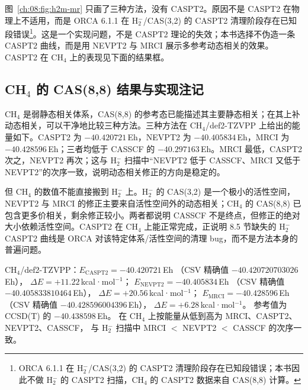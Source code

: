图~\ref{ch:08:fig:h2m-mr} 只画了三种方法，没有 CASPT2。原因不是 CASPT2 在物理上不适用，而是 ORCA 6.1.1 在 H$_2^-$/CAS(3,2) 的 CASPT2 清理阶段存在已知段错误\footnote{ORCA 6.1.1 在 H$_2^-$/CAS(3,2) 的 CASPT2 清理阶段存在已知段错误；本书因此不做 H$_2^-$ 的 CASPT2 扫描，CH$_4$ 的 CASPT2 数据来自 CAS(8,8) 计算。}。这是一个实现问题，不是 CASPT2 理论的失效；本书选择不伪造一条 CASPT2 曲线，而是用 NEVPT2 与 MRCI 展示多参考动态相关的效果。CASPT2 在 CH$_4$ 上的表现见下面的结果框。

\subsection{CH$_4$ 的 CAS(8,8) 结果与实现注记}
\label{ch:08:sec:ch4}

CH$_4$ 是弱静态相关体系，CAS(8,8) 的参考态已能描述其主要静态相关；在其上补动态相关，可以干净地比较三种方法。三种方法在 CH$_4$/def2-TZVPP 上给出的能量如下。CASPT2 为 $-40.420721$\,Eh，NEVPT2 为 $-40.405834$\,Eh，MRCI 为 $-40.428596$\,Eh；三者均低于 CASSCF 的 $-40.297163$\,Eh。MRCI 最低，CASPT2 次之，NEVPT2 再次；这与 H$_2^-$ 扫描中“NEVPT2 低于 CASSCF、MRCI 又低于 NEVPT2”的次序一致，说明动态相关修正的方向是稳定的。

但 CH$_4$ 的数值不能直接搬到 H$_2^-$ 上。H$_2^-$ 的 CAS(3,2) 是一个极小的活性空间，NEVPT2 与 MRCI 的修正主要来自活性空间外的动态相关；CH$_4$ 的 CAS(8,8) 已包含更多价相关，剩余修正较小。两者都说明 CASSCF 不是终点，但修正的绝对大小依赖活性空间。CASPT2 在 CH$_4$ 上能正常完成，正说明 8.5 节缺失的 H$_2^-$ CASPT2 曲线是 ORCA 对该特定体系/活性空间的清理 bug，而不是方法本身的普遍问题。

\begin{ch4box}
CH$_4$/def2-TZVPP：$E_{\mathrm{CASPT2}} = -40.420721$\,Eh
（CSV 精确值 $-40.420720703026$\,Eh），
$\Delta E = +11.22$\,kcal·mol$^{-1}$；
$E_{\mathrm{NEVPT2}} = -40.405834$\,Eh
（CSV 精确值 $-40.405833810464$\,Eh），
$\Delta E = +20.56$\,kcal·mol$^{-1}$；
$E_{\mathrm{MRCI}} = -40.428596$\,Eh
（CSV 精确值 $-40.428596004396$\,Eh），
$\Delta E = +6.28$\,kcal·mol$^{-1}$。
参考值为 CCSD(T) 的 $-40.438598$\,Eh。
在 CH$_4$ 上按能量从低到高为 MRCI、CASPT2、NEVPT2、CASSCF，
与 H$_2^-$ 扫描中 MRCI $<$ NEVPT2 $<$ CASSCF 的次序一致。
\end{ch4box}

